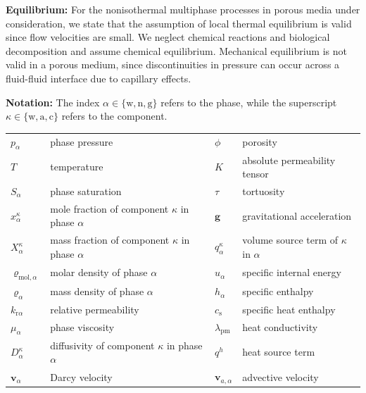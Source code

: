 \textbf{Equilibrium:}
For the nonisothermal multiphase processes in porous media under
consideration, we state that the assumption of local thermal
equilibrium is valid since flow velocities are small. We neglect
chemical reactions and biological decomposition and assume chemical
equilibrium.  Mechanical equilibrium is not valid in a porous medium, 
since discontinuities in pressure can occur across a fluid-fluid
interface due to capillary effects.

\textbf{Notation:} The index $\alpha \in \{\text{w}, \text{n}, \text{g}\}$ refers 
to the phase, while the superscript $\kappa \in \{\text{w}, \text{a}, \text{c}\}$ refers 
to the component. \\
\begin{tabular}{llll}
$p_\alpha$ & phase pressure & $\phi$ & porosity \\
$T$ & temperature & $K$ & absolute permeability tensor \\
$S_\alpha$ & phase saturation & $\tau$ & tortuosity \\
$x_\alpha^\kappa$ & mole fraction of component $\kappa$ in phase $\alpha$ & $\boldsymbol{g}$ & gravitational acceleration \\
$X_\alpha^\kappa$ & mass fraction of component $\kappa$ in phase $\alpha$ & $q^\kappa_\alpha$ & volume source term of $\kappa$ in $\alpha$ \\
$\varrho_{\text{mol},\alpha}$ & molar density of phase $\alpha$ & $u_\alpha$ & specific internal energy \\
$\varrho_{\alpha}$ & mass density of phase $\alpha$ & $h_\alpha$ & specific enthalpy \\
$k_{\text{r}\alpha}$ & relative permeability & $c_\text{s}$ & specific heat enthalpy \\
$\mu_\alpha$ & phase viscosity & $\lambda_\text{pm}$ & heat conductivity \\
$D_\alpha^\kappa$ & diffusivity of component $\kappa$ in phase $\alpha$ & $q^h$ & heat source term \\
$\boldsymbol{v}_\alpha$ & Darcy velocity & $\boldsymbol{v}_{a,\alpha}$  & advective velocity
\end{tabular}


